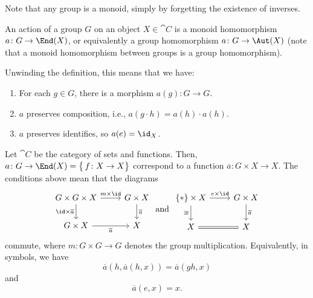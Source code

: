 \documentclass{willowtreebook}
\begin{document}
Note that any group is a monoid, simply by forgetting the existence of inverses. 
\begin{definition}
    An action of a group $G$ on an object $X \in \cat C$ is a monoid homomorphism $a \colon G \to \End(X)$, or equivalently a group homomorphism $a \colon G \to \Aut(X)$ (note that a monoid homomorphism between groups is a group homomorphism). 
\end{definition}
\begin{remark}
    Unwinding the definition, this means that we have:
    \begin{enumerate}
        \item For each $g \in G$, there is a morphism $a(g) \colon G \to G$.
        \item $a$ preserves composition, i.e., $a(g \cdot h) = a(h) \cdot a(h)$. 
        \item $a$ preserves identifies, so $a(e) = \id_X$.
    \end{enumerate}
\end{remark}
\begin{example}
    Let $\cat C$ be the category of sets and functions. Then, $a \colon G \to \End(X) = \big\{\,f \colon X \to X\big\}$ correspond to a function $\overline{a} \colon G \times X \to X$. The conditions above mean that the diagrams
\[\begin{tikzcd}[ampersand replacement=\&]
	{G \times G \times X} \& {G \times X} \\
	{G \times X} \& X
	\arrow["{\id \times \overline{a}}"', from=1-1, to=2-1]
	\arrow["{m \times \id}", from=1-1, to=1-2]
	\arrow["{\overline{a}}", from=1-2, to=2-2]
	\arrow["{\overline{a}}"', from=2-1, to=2-2]
\end{tikzcd}
\text{ and }
\begin{tikzcd}[ampersand replacement=\&]
	{\{\ast\} \times X} \& {G \times X} \\
	X \& X
	\arrow["{e \times \id}", from=1-1, to=1-2]
	\arrow["\cong"', from=1-1, to=2-1]
	\arrow["{\overline{a}}", from=1-2, to=2-2]
	\arrow[Rightarrow, no head, from=2-1, to=2-2]
\end{tikzcd}\]
commute, where $m \colon G \times G \to G$ denotes the group multiplication. Equivalently, in symbols, we have
\[
\overline{a}(h,\overline{a}(h,x)) = \overline{a}(gh,x) 
\]
and
\[
\overline{a}(e,x) = x. 
\]
\end{example}
\end{document}
